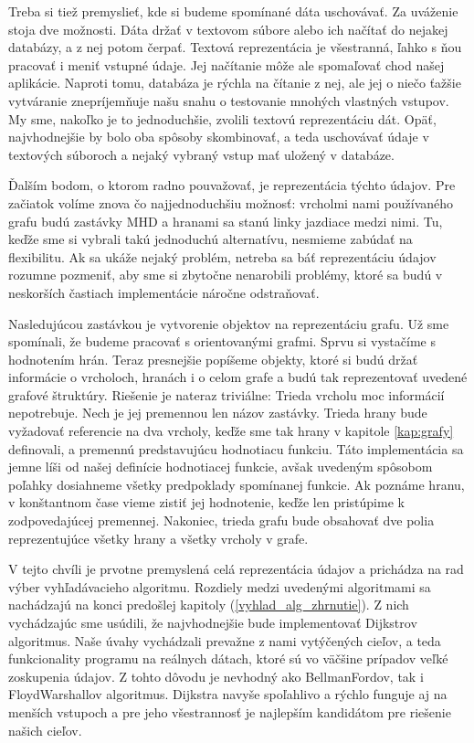 Treba si tiež premyslieť, kde si budeme spomínané dáta uschovávať. Za uváženie stoja dve možnosti. Dáta držať v textovom súbore alebo ich načítať do nejakej databázy, a z nej potom čerpať. Textová reprezentácia je všestranná, ľahko s ňou pracovať i meniť vstupné údaje. Jej načítanie môže ale spomaľovať chod našej aplikácie. Naproti tomu, databáza je rýchla na čítanie z nej, ale jej o niečo ťažšie vytváranie znepríjemňuje našu snahu o testovanie mnohých vlastných vstupov. My sme, nakoľko je to jednoduchšie, zvolili textovú reprezentáciu dát. Opäť, najvhodnejšie by bolo oba spôsoby skombinovať, a teda uschovávať údaje v textových súboroch a nejaký vybraný vstup mať uložený v databáze.\newline

Ďalším bodom, o ktorom radno pouvažovať, je reprezentácia týchto údajov. Pre začiatok volíme znova čo najjednoduchšiu možnosť: vrcholmi nami používaného grafu budú zastávky MHD a hranami sa stanú linky jazdiace medzi nimi. Tu, keďže sme si vybrali takú jednoduchú alternatívu, nesmieme zabúdať na flexibilitu. Ak sa ukáže nejaký problém, netreba sa báť reprezentáciu údajov rozumne pozmeniť, aby sme si zbytočne nenarobili problémy, ktoré sa budú v neskorších častiach implementácie náročne odstraňovať.\newline

Nasledujúcou zastávkou je vytvorenie objektov na reprezentáciu grafu. Už sme spomínali, že budeme pracovať s orientovanými grafmi. Sprvu si vystačíme s hodnotením hrán. Teraz presnejšie popíšeme objekty, ktoré si budú držať informácie o vrcholoch, hranách i o celom grafe a budú tak reprezentovať uvedené grafové štruktúry. Riešenie je nateraz triviálne: Trieda vrcholu moc informácií nepotrebuje. Nech je jej premennou len názov zastávky. Trieda hrany bude vyžadovať referencie na dva vrcholy, keďže sme tak hrany v kapitole \ref{kap:grafy} definovali, a premennú predstavujúcu hodnotiacu funkciu. Táto implementácia sa jemne líši od našej definície hodnotiacej funkcie, avšak uvedeným spôsobom poľahky dosiahneme všetky predpoklady spomínanej funkcie. Ak poznáme hranu, v konštantnom čase vieme zistiť jej hodnotenie, keďže len pristúpime k zodpovedajúcej premennej. Nakoniec, trieda grafu bude obsahovať dve polia reprezentujúce všetky hrany a všetky vrcholy v grafe.\newline

V tejto chvíli je prvotne premyslená celá reprezentácia údajov a prichádza na rad výber vyhľadávacieho algoritmu. Rozdiely medzi uvedenými algoritmami sa nachádzajú na konci predošlej kapitoly (\ref{vyhlad_alg_zhrnutie}). Z nich vychádzajúc sme usúdili, že najvhodnejšie bude implementovať Dijkstrov algoritmus. Naše úvahy vychádzali prevažne z nami vytýčených cieľov, a teda funkcionality programu na reálnych dátach, ktoré sú vo väčšine prípadov veľké zoskupenia údajov. Z tohto dôvodu je nevhodný ako Bellman\textendash Fordov, tak i Floyd\textendash Warshallov algoritmus. Dijkstra navyše spoľahlivo a rýchlo funguje aj na menších vstupoch a pre jeho všestrannosť je najlepším kandidátom pre riešenie našich cieľov.\newline

